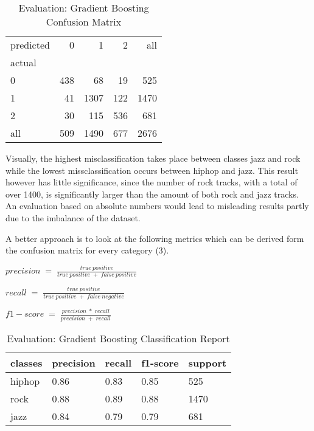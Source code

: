 \begin{table}[H]
  \centering
  \begin{tabular}{lrrrr}
    \toprule
    predicted &    0 &     1 &    2 &   all \\
    actual &      &       &      &       \\
    \midrule
    0      &  438 &    68 &   19 &   525 \\
    1      &   41 &  1307 &  122 &  1470 \\
    2      &   30 &   115 &  536 &   681 \\
    all    &  509 &  1490 &  677 &  2676 \\
    \bottomrule
    \end{tabular}
  \caption{Evaluation: Gradient Boosting Confusion Matrix}%
  \label{tbl:gb_confusion_matrix}%
\end{table} 

Visually, the highest misclassification takes place between classes jazz and rock while the lowest missclassification occurs
between hiphop and jazz. This result however has little significance, since the number of rock tracks, with a total of over 
1400, is significantly larger than the amount of both rock and jazz tracks. An evaluation based on absolute numbers would lead to 
misleading results partly due to the imbalance of the dataset. 

A better approach is to look at the following metrics which can be derived form the confusion matrix for every category \cite[p.235]{Davis_2006} (3). 

\(precision\;= \;\frac{true\:positive}{true\:positive\;+\;false\:positive}\)

\(recall\;= \;\frac{true\:positive}{true\:positive\;+\;false\:negative}\)

\(f1-score\;= \;\frac{precision\;*\;recall}{precision\;+\;recall}\)

\begin{table}[H]
  \centering
  \begin{tabular}{lllll}
    \toprule
    classes & precision & recall & f1-score & support \\
    \midrule
     hiphop &      0.86 &   0.83 &     0.85 &     525 \\
       rock &      0.88 &   0.89 &     0.88 &    1470 \\
       jazz &      0.84 &   0.79 &     0.79 &     681 \\
    \bottomrule
    \end{tabular}
  \caption{Evaluation: Gradient Boosting Classification Report}%
  \label{tbl:gb_classification_Report}%
\end{table} 

